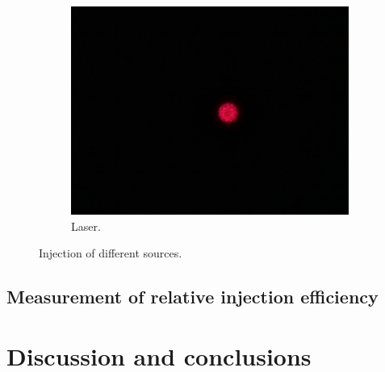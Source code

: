 \documentclass[a4paper, 12pt]{paper}
\begin{document}
\begin{figure}[H]
\begin{subfigure}[b]{0.30\textwidth}
        \includegraphics[width=\textwidth]{img/laser-injection.jpg}
        \caption{Laser.}
    \end{subfigure}
    \caption{Injection of different sources.}
\label{fig:sources_injection}


\end{figure}
\subsection{Measurement of relative injection efficiency}

\section{Discussion and conclusions}
\lipsum[6]
\end{document}
